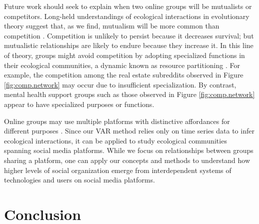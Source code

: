 \documentclass[letterpaper]{article}\usepackage[]{graphicx}\usepackage[]{color}
\begin{document}
Future work should seek to explain when two online groups will be mutualists or competitors. 
Long-held understandings of ecological interactions in evolutionary theory suggest that, as we find, mutualism will be more common than competition \cite{kropotkin_mutual_2012}. 
Competition is unlikely to persist because it decreases survival; but mutualistic relationships are likely to endure because they increase it.
In this line of theory, groups might avoid competition by adopting specialized functions in their ecological communities, a dynamic known as resource partitioning  \cite{carroll_concentration_1985}. For example, the competition among the real estate subreddits observed in Figure \ref{fig:comp.network} may occur due to insufficient specialization.  
By contrast, mental health support groups such as those observed in Figure \ref{fig:comp.network} appear to have specialized purposes or functions. 


Online groups may use multiple platforms with distinctive affordances for different purposes \cite{kiene_technological_2019}. 
Since our VAR method relies only on time series data to infer ecological interactions, it can be applied to study ecological communities spanning social media platforms. 
While we focus on relationships between groups sharing a platform, one can apply our concepts and methods to understand how higher levels of social organization emerge from interdependent systems of technologies and users on social media platforms. 

\section{Conclusion}
\end{document}
